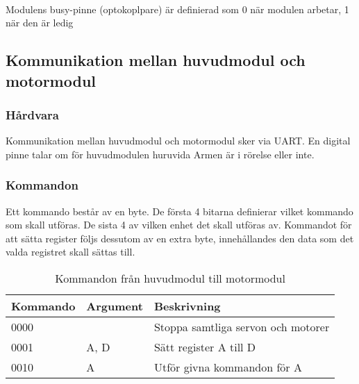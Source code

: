  \\

Modulens busy-pinne (optokoplpare) är definierad som 0 när modulen arbetar, 1 när den är ledig

\subsection{Kommunikation mellan huvudmodul och motormodul}

\subsubsection{Hårdvara}
Kommunikation mellan huvudmodul och motormodul sker via UART. En digital pinne talar om för huvudmodulen huruvida Armen är i rörelse eller inte.

\subsubsection{Kommandon}
Ett kommando består av en byte. De första 4 bitarna definierar vilket kommando som skall utföras. De sista 4 av vilken enhet det skall utföras av. Kommandot för att sätta register följs dessutom av en extra byte, innehållandes den data som det valda registret skall sättas till. 

\begin{table}[h]
	\centering
		\begin{tabularx}{\textwidth}{| l | l | X |}
			\hline
			\textbf{Kommando} & \textbf{Argument} & \textbf{Beskrivning} \\
			\hline
			{0000} & {} & {Stoppa samtliga servon och motorer} \\
			\hline
			{0001} & {A, D} & {Sätt register A till D} \\
			\hline
			{0010} & {A} & {Utför givna kommandon för A} \\
			\hline
		\end{tabularx}
	\caption{Kommandon från huvudmodul till motormodul} \label{protokoll:pc-motor}
\end{table}


